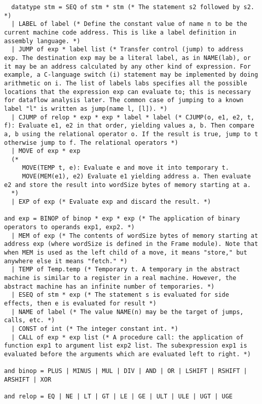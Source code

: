 \begin{verbatim}
  datatype stm = SEQ of stm * stm (* The statement s2 followed by s2. *)
  | LABEL of label (* Define the constant value of name n to be the current machine code address. This is like a label definition in assembly language. *)
  | JUMP of exp * label list (* Transfer control (jump) to address exp. The destination exp may be a literal label, as in NAME(lab), or it may be an address calculated by any other kind of expression. For example, a C-language switch (i) statement may be implemented by doing arithmetic on i. The list of labels labs specifies all the possible locations that the expression exp can evaluate to; this is necessary for dataflow analysis later. The common case of jumping to a known label "l" is written as jump(name l, [l]). *)
  | CJUMP of relop * exp * exp * label * label (* CJUMP(o, e1, e2, t, f): Evaluate e1, e2 in that order, yielding values a, b. Then compare a, b using the relational operator o. If the result is true, jump to t otherwise jump to f. The relational operators *)
  | MOVE of exp * exp 
  (*
     MOVE(TEMP t, e): Evaluate e and move it into temporary t. 
     MOVE(MEM(e1), e2) Evaluate e1 yielding address a. Then evaluate e2 and store the result into wordSize bytes of memory starting at a.
  *)
  | EXP of exp (* Evaluate exp and discard the result. *)

and exp = BINOP of binop * exp * exp (* The application of binary operators to operands exp1, exp2. *)
  | MEM of exp (* The contents of wordSize bytes of memory starting at address exp (where wordSize is defined in the Frame module). Note that when MEM is used as the left child of a move, it means "store," but anywhere else it means "fetch." *)
  | TEMP of Temp.temp (* Temporary t. A temporary in the abstract machine is similar to a register in a real machine. However, the abstract machine has an infinite number of temporaries. *)
  | ESEQ of stm * exp (* The statement s is evaluated for side effects, then e is evaluated for result *)
  | NAME of label (* The value NAME(n) may be the target of jumps, calls, etc. *)
  | CONST of int (* The integer constant int. *)
  | CALL of exp * exp list (* A procedure call: the application of function exp1 to argument list exp2 list. The subexpression exp1 is evaluated before the arguments which are evaluated left to right. *)

and binop = PLUS | MINUS | MUL | DIV | AND | OR | LSHIFT | RSHIFT | ARSHIFT | XOR

and relop = EQ | NE | LT | GT | LE | GE | ULT | ULE | UGT | UGE
\end{verbatim}

